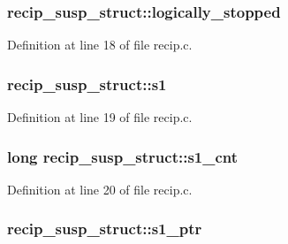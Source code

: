 \subsubsection[{\texorpdfstring{logically\+\_\+stopped}{logically_stopped}}]{ recip\+\_\+susp\+\_\+struct\+::logically\+\_\+stopped}\hypertarget{structrecip__susp__struct_a701c85bf9f93a937e47bdd7bad877304}{}\label{structrecip__susp__struct_a701c85bf9f93a937e47bdd7bad877304}


Definition at line 18 of file recip.\+c.

\subsubsection[{\texorpdfstring{s1}{s1}}]{ recip\+\_\+susp\+\_\+struct\+::s1}\hypertarget{structrecip__susp__struct_a714eb98ced5568cad610d1fcb068a579}{}\label{structrecip__susp__struct_a714eb98ced5568cad610d1fcb068a579}


Definition at line 19 of file recip.\+c.

\subsubsection[{\texorpdfstring{s1\+\_\+cnt}{s1_cnt}}]{\setlength{\rightskip}{0pt plus 5cm}long recip\+\_\+susp\+\_\+struct\+::s1\+\_\+cnt}\hypertarget{structrecip__susp__struct_a38bcf2fe43d6f9bec3c91b4ca753953d}{}\label{structrecip__susp__struct_a38bcf2fe43d6f9bec3c91b4ca753953d}


Definition at line 20 of file recip.\+c.

\subsubsection[{\texorpdfstring{s1\+\_\+ptr}{s1_ptr}}]{ recip\+\_\+susp\+\_\+struct\+::s1\+\_\+ptr}\hypertarget{structrecip__susp__struct_a6614edeced711b9362d59034ebd5b3c9}{}\label{structrecip__susp__struct_a6614edeced711b9362d59034ebd5b3c9}


